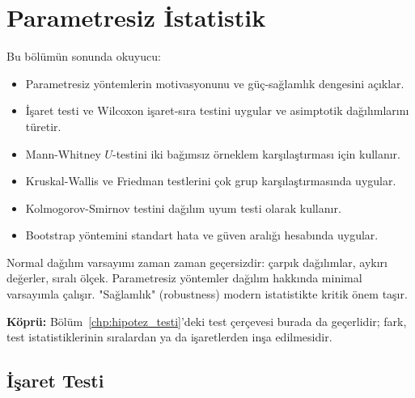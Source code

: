 \chapter{Parametresiz İstatistik}
\label{chp:parametresiz}


\begin{kazanimlar}
Bu bölümün sonunda okuyucu:
\begin{itemize}
  \item Parametresiz yöntemlerin motivasyonunu ve güç-sağlamlık dengesini açıklar.
  \item İşaret testi ve Wilcoxon işaret-sıra testini uygular ve asimptotik dağılımlarını türetir.
  \item Mann-Whitney $U$-testini iki bağımsız örneklem karşılaştırması için kullanır.
  \item Kruskal-Wallis ve Friedman testlerini çok grup karşılaştırmasında uygular.
  \item Kolmogorov-Smirnov testini dağılım uyum testi olarak kullanır.
  \item Bootstrap yöntemini standart hata ve güven aralığı hesabında uygular.
\end{itemize}
\end{kazanimlar}

\begin{motivasyon}
Normal dağılım varsayımı zaman zaman geçersizdir: çarpık dağılımlar, aykırı değerler, sıralı ölçek. Parametresiz yöntemler dağılım hakkında minimal varsayımla çalışır. "Sağlamlık" (robustness) modern istatistikte kritik önem taşır.

\medskip
\noindent\textbf{Köprü:} Bölüm~\ref{chp:hipotez_testi}'deki test çerçevesi burada da geçerlidir; fark, test istatistiklerinin sıralardan ya da işaretlerden inşa edilmesidir.
\end{motivasyon}

\section{İşaret Testi}
\label{sec:isaret_testi}

